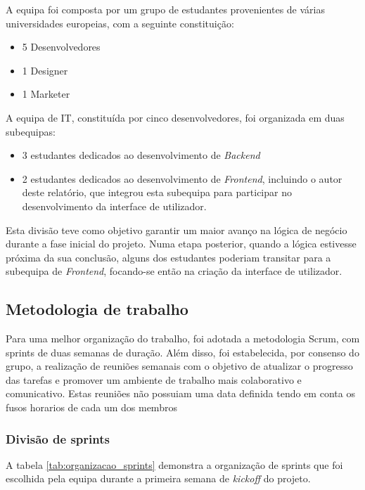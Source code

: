 A equipa foi composta por um grupo de estudantes provenientes de várias universidades europeias, com a seguinte constituição:

\begin{itemize}
    \item 5 Desenvolvedores
    \item 1 Designer
    \item 1 Marketer
\end{itemize}

A equipa de IT, constituída por cinco desenvolvedores, foi organizada em duas subequipas: 
\begin{itemize}
    \item 3 estudantes dedicados ao desenvolvimento de \textit{Backend}
    \item 2 estudantes dedicados ao desenvolvimento de \textit{Frontend}, incluindo o autor deste relatório, que integrou esta subequipa para participar no desenvolvimento da interface de utilizador.
\end{itemize}

Esta divisão teve como objetivo garantir um maior avanço na lógica de negócio durante a fase inicial do projeto. 
Numa etapa posterior, quando a lógica estivesse próxima da sua conclusão, alguns dos estudantes poderiam transitar para a subequipa de \textit{Frontend}, focando-se então na criação da interface de utilizador.

\subsection{Metodologia de trabalho}

Para uma melhor organização do trabalho, foi adotada a metodologia Scrum, com sprints de duas semanas de duração. Além disso, foi estabelecida, por consenso do grupo, a realização de reuniões semanais com o objetivo de atualizar o progresso das tarefas e promover um ambiente de trabalho mais colaborativo e comunicativo. Estas reuniões não possuiam uma data definida tendo em conta os fusos horarios de cada um dos membros

\subsubsection{Divisão de sprints}

A tabela \ref{tab:organizacao_sprints} demonstra a organização de sprints que foi escolhida pela equipa durante a primeira semana de \textit{kickoff} do projeto.

